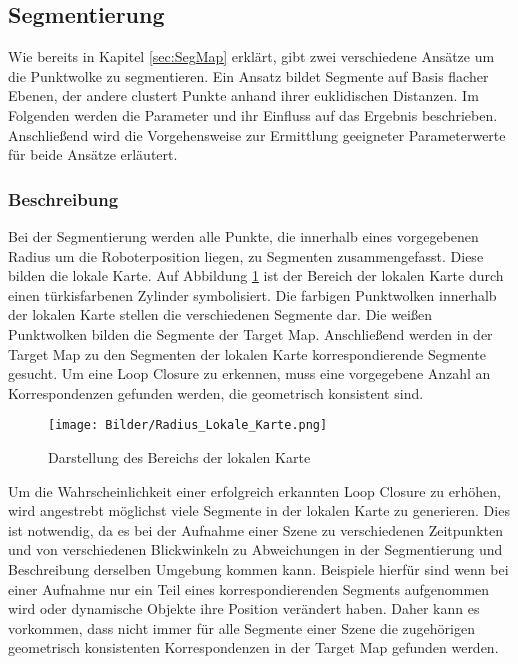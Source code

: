 \subsection{Segmentierung}
\label{sec:Segmentierung}

Wie bereits in Kapitel \ref{sec:SegMap} erklärt, gibt zwei verschiedene Ansätze um die Punktwolke zu segmentieren. Ein Ansatz bildet Segmente auf Basis flacher Ebenen, der andere clustert Punkte anhand ihrer euklidischen Distanzen. Im Folgenden werden die Parameter und ihr Einfluss auf das Ergebnis beschrieben. Anschließend wird die Vorgehensweise zur Ermittlung geeigneter Parameterwerte für beide Ansätze erläutert.

\subsubsection{Beschreibung}
\label{sec:Beschreibung Segmentierung}

Bei der Segmentierung werden alle Punkte, die innerhalb eines vorgegebenen Radius um die Roboterposition liegen, zu Segmenten zusammengefasst. Diese bilden die lokale Karte. Auf Abbildung \ref{fig:lokaleKarte} ist der Bereich der lokalen Karte durch einen türkisfarbenen Zylinder symbolisiert. Die farbigen Punktwolken innerhalb der lokalen Karte stellen die verschiedenen Segmente dar. Die weißen Punktwolken bilden die Segmente der Target Map. Anschließend werden in der Target Map zu den  Segmenten der lokalen Karte korrespondierende Segmente gesucht. Um eine Loop Closure zu erkennen, muss eine vorgegebene Anzahl an Korrespondenzen gefunden werden, die geometrisch konsistent sind.

\begin{figure}
	\centering
	\texttt{[image: Bilder/Radius\_Lokale\_Karte.png]}
	\caption{Darstellung des Bereichs der lokalen Karte}
	\label{fig:lokaleKarte}
\end{figure} 

Um die Wahrscheinlichkeit einer erfolgreich erkannten Loop Closure zu erhöhen, wird angestrebt möglichst viele Segmente in der lokalen Karte zu generieren. Dies ist notwendig, da es bei der Aufnahme einer Szene zu verschiedenen Zeitpunkten und von verschiedenen Blickwinkeln zu Abweichungen in der Segmentierung und Beschreibung derselben Umgebung kommen kann. Beispiele hierfür sind wenn bei einer Aufnahme nur ein Teil eines korrespondierenden Segments aufgenommen wird oder dynamische Objekte ihre Position verändert haben. Daher kann es vorkommen, dass nicht immer für alle Segmente einer Szene die zugehörigen geometrisch konsistenten Korrespondenzen in der Target Map gefunden werden.

